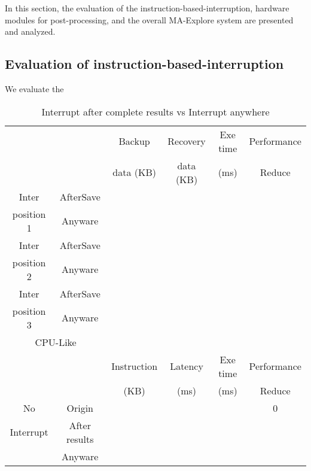 \label{sec:experiments}

In this section, the evaluation of the instruction-based-interruption, hardware modules for post-processing, and the overall MA-Explore system are presented and analyzed.

\subsection{ Evaluation of instruction-based-interruption}

We evaluate the 



\begin{table}[t]
    \centering
    \caption{Interrupt after complete results vs Interrupt anywhere}
\begin{tabular}{|c|c|c|c|c|c|}
  \hline
  \multicolumn{1}{|c}{} &       & \multicolumn{1}{c|}{Backup } & \multicolumn{1}{c|}{Recovery} & Exe time & Performance \bigstrut[t]\\
  \multicolumn{1}{|c}{} &       & \multicolumn{1}{c|}{data (KB)} & \multicolumn{1}{c|}{ data (KB)} & (ms)  & Reduce \bigstrut[b]\\
  \hline
  \multicolumn{1}{|p{3.315em}|}{Inter } & \multicolumn{1}{p{3.69em}|}{AfterSave} &       &       &       &  \bigstrut\\
  \cline{2-6}\multicolumn{1}{|p{3.315em}|}{position 1} & Anyware &       &       &       &  \bigstrut\\
  \hline
  \multicolumn{1}{|p{3.315em}|}{Inter } & \multicolumn{1}{p{3.69em}|}{AfterSave} &       &       &       &  \bigstrut\\
  \cline{2-6}\multicolumn{1}{|p{3.315em}|}{ position 2} & Anyware &       &       &       &  \bigstrut\\
  \hline
  \multicolumn{1}{|p{3.315em}|}{Inter } & \multicolumn{1}{p{3.69em}|}{AfterSave} &       &       &       &  \bigstrut\\
  \cline{2-6}\multicolumn{1}{|p{3.315em}|}{position 3} & Anyware &       &       &       &  \bigstrut\\
  \hline
  \multicolumn{2}{|p{7.005em}|}{CPU-Like} &       &       &       &  \bigstrut\\
  \hline
  \multicolumn{1}{|c}{} &       & \multicolumn{1}{c|}{Instruction} & \multicolumn{1}{c|}{Latency} & Exe time & Performance \bigstrut[t]\\
  \multicolumn{1}{|c}{} &       & \multicolumn{1}{c|}{ (KB)} & \multicolumn{1}{c|}{(ms)} & (ms)  & Reduce \bigstrut[b]\\
  \hline
  \multicolumn{1}{|c|}{No} & \multicolumn{1}{p{3.69em}|}{Origin} &       &       &       & 0 \bigstrut\\
  \cline{2-6}\multicolumn{1}{|c|}{ Interrupt} & \multicolumn{1}{p{3.69em}|}{After results} &       &       &       &  \bigstrut\\
  \cline{2-6}      & Anyware &       &       &       &  \bigstrut\\
  \hline
  \end{tabular}%
  
    \label{tab:anywhere}%
  \end{table}%
  